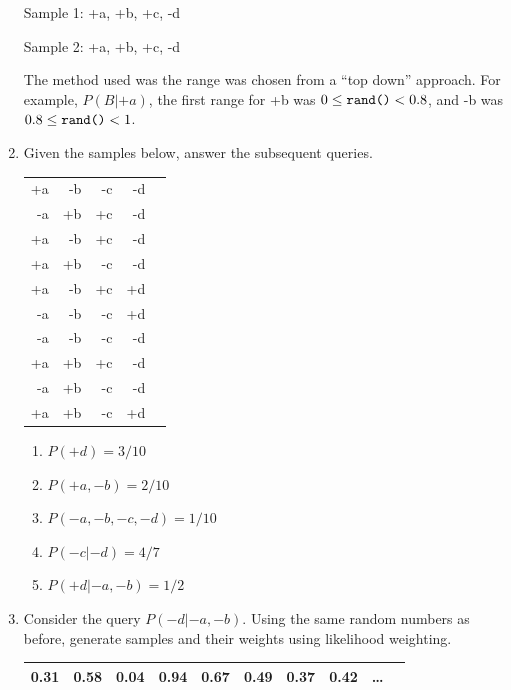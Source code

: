 \documentclass[12pt]{article}
\begin{document}
\begin{enumerate}
Sample 1: +a, +b, +c, -d

Sample 2: +a, +b, +c, -d

The method used was the range was chosen from a ``top down'' approach. For example, $P(B|+a)$, the first range for +b was $0 \leq \text{{\tt rand()}} < 0.8$, and -b was $0.8 \leq \text{{\tt rand()}} < 1$.

\item Given the samples below, answer the subsequent queries.

\begin{flushleft}
\begin{tabular}{rrrrr} 
+a & -b & -c & -d  \\
-a & +b & +c & -d  \\
+a & -b & +c & -d  \\
+a & +b & -c & -d  \\
+a & -b & +c & +d  \\
-a & -b & -c & +d  \\
-a & -b & -c & -d  \\
+a & +b & +c & -d  \\
-a & +b & -c & -d  \\
+a & +b & -c & +d  \\
\end{tabular}
\end{flushleft}

\begin{enumerate}

  \item $P(+d) = 3/10$

  \item $P(+a,-b) = 2/10$

  \item $P(-a,-b,-c,-d) = 1/10$

  \item $P(-c | -d) = 4/7$

  \item $P(+d | -a, -b) = 1/2$

\end{enumerate}

\item Consider the query $P(-d|-a,-b)$.  Using the same random numbers
  as before, generate samples and their weights using likelihood
  weighting.

\begin{center}
\begin{tabular}{|c|c|c|c|c|c|c|c|c|c|} \hline
0.31 & 0.58 & 0.04 & 0.94 & 0.67 & 0.49 & 0.37 & 0.42 & \ldots \\ \hline
\end{tabular}
\end{center}


\end{enumerate}
\end{document}

